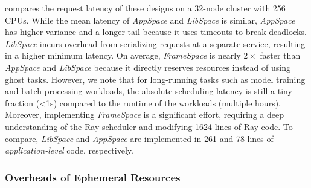  compares the request latency of these designs on a 32-node cluster with 256 CPUs.
While the mean latency of \textit{AppSpace} and \textit{LibSpace} is similar, \textit{AppSpace} has higher variance and a longer tail because it uses timeouts to break deadlocks.
\textit{LibSpace} incurs overhead from serializing requests at a separate service, resulting in a higher minimum latency. On average, \textit{FrameSpace} is nearly $2\times$ faster than \textit{AppSpace} and \textit{LibSpace} because it directly reserves resources instead of using ghost tasks. However, we note that for long-running tasks such as model training and batch processing workloads, the absolute scheduling latency is still a tiny fraction (<1s) compared to the runtime of the workloads (multiple hours). Moreover, implementing \textit{FrameSpace} is a significant effort, requiring a deep understanding of the Ray scheduler and modifying 1624 lines of Ray code.
To compare, \textit{LibSpace} and \textit{AppSpace} are implemented in 261 and 78 lines of \emph{application-level} code, respectively.



\subsubsection{Overheads of Ephemeral Resources}


